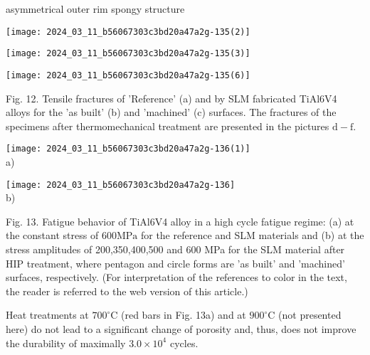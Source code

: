 \documentclass[10pt]{article}
\begin{document}
asymmetrical outer rim spongy structure

\begin{center}
\texttt{[image: 2024\_03\_11\_b56067303c3bd20a47a2g-135(2)]}
\end{center}

\begin{center}
\texttt{[image: 2024\_03\_11\_b56067303c3bd20a47a2g-135(3)]}
\end{center}

\begin{center}
\texttt{[image: 2024\_03\_11\_b56067303c3bd20a47a2g-135(6)]}
\end{center}

Fig. 12. Tensile fractures of 'Reference' (a) and by SLM fabricated TiAl6V4 alloys for the 'as built' (b) and 'machined' (c) surfaces. The fractures of the specimens after thermomechanical treatment are presented in the pictures $\mathrm{d}-\mathrm{f}$.

\texttt{[image: 2024\_03\_11\_b56067303c3bd20a47a2g-136(1)]}\\
a)

\texttt{[image: 2024\_03\_11\_b56067303c3bd20a47a2g-136]}\\
b)

Fig. 13. Fatigue behavior of TiAl6V4 alloy in a high cycle fatigue regime: (a) at the constant stress of $600 \mathrm{MPa}$ for the reference and SLM materials and (b) at the stress amplitudes of 200,350,400,500 and 600 MPa for the SLM material after HIP treatment, where pentagon and circle forms are 'as built' and 'machined' surfaces, respectively. (For interpretation of the references to color in the text, the reader is referred to the web version of this article.)

Heat treatments at $700^{\circ} \mathrm{C}$ (red bars in Fig. 13a) and at $900^{\circ} \mathrm{C}$ (not presented here) do not lead to a significant change of porosity and, thus, does not improve the durability of maximally $3.0 \times 10^{4}$ cycles.
\end{document}
